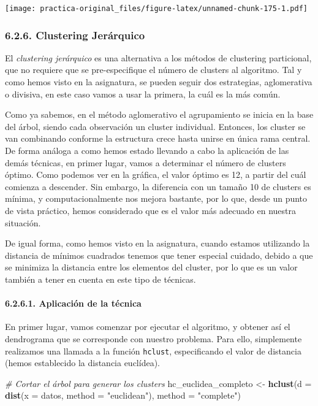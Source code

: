 \documentclass[spanish,]{article}
\newenvironment{Shaded}{\begin{snugshade}}{\end{snugshade}}
\newcommand{\KeywordTok}[1]{\textcolor[rgb]{0.13,0.29,0.53}{\textbf{#1}}}
\newcommand{\DataTypeTok}[1]{\textcolor[rgb]{0.13,0.29,0.53}{#1}}
\newcommand{\StringTok}[1]{\textcolor[rgb]{0.31,0.60,0.02}{#1}}
\newcommand{\CommentTok}[1]{\textcolor[rgb]{0.56,0.35,0.01}{\textit{#1}}}
\newcommand{\NormalTok}[1]{#1}
\let\oldparagraph\paragraph
\renewcommand{\paragraph}[1]{\oldparagraph{#1}\mbox{}}
\begin{document}
\texttt{[image: practica-original\_files/figure-latex/unnamed-chunk-175-1.pdf]}

\subsubsection{6.2.6. Clustering
Jerárquico}\label{clustering-jerarquico}

El \emph{clustering jerárquico} es una alternativa a los métodos de
clustering particional, que no requiere que se pre-especifique el número
de clusters al algoritmo. Tal y como hemos visto en la asignatura, se
pueden seguir dos estrategias, aglomerativa o divisiva, en este caso
vamos a usar la primera, la cuál es la más común.

Como ya sabemos, en el método aglomerativo el agrupamiento se inicia en
la base del árbol, siendo cada observación un cluster individual.
Entonces, los cluster se van combinando conforme la estructura crece
hasta unirse en única rama central. De forma análoga a como hemos estado
llevando a cabo la aplicación de las demás técnicas, en primer lugar,
vamos a determinar el número de clusters óptimo. Como podemos ver en la
gráfica, el valor óptimo es 12, a partir del cuál comienza a descender.
Sin embargo, la diferencia con un tamaño 10 de clusters es mínima, y
computacionalmente nos mejora bastante, por lo que, desde un punto de
vista práctico, hemos considerado que es el valor más adecuado en
nuestra situación.

De igual forma, como hemos visto en la asignatura, cuando estamos
utilizando la distancia de mínimos cuadrados tenemos que tener especial
cuidado, debido a que se minimiza la distancia entre los elementos del
cluster, por lo que es un valor también a tener en cuenta en este tipo
de técnicas.

\paragraph{6.2.6.1. Aplicación de la
técnica}\label{aplicacion-de-la-tecnica}

En primer lugar, vamos comenzar por ejecutar el algoritmo, y obtener así
el dendrograma que se corresponde con nuestro problema. Para ello,
simplemente realizamos una llamada a la función \texttt{hclust},
especificando el valor de distancia (hemos establecido la distancia
euclídea).

\begin{Shaded}
\begin{Highlighting}[]
\CommentTok{# Cortar el árbol para generar los clusters}
\NormalTok{hc_euclidea_completo <-}\StringTok{ }\KeywordTok{hclust}\NormalTok{(}\DataTypeTok{d =} \KeywordTok{dist}\NormalTok{(}\DataTypeTok{x =}\NormalTok{ datos, }\DataTypeTok{method =} \StringTok{"euclidean"}\NormalTok{), }\DataTypeTok{method =} \StringTok{"complete"}\NormalTok{)}
\end{Highlighting}
\end{Shaded}
\end{document}
